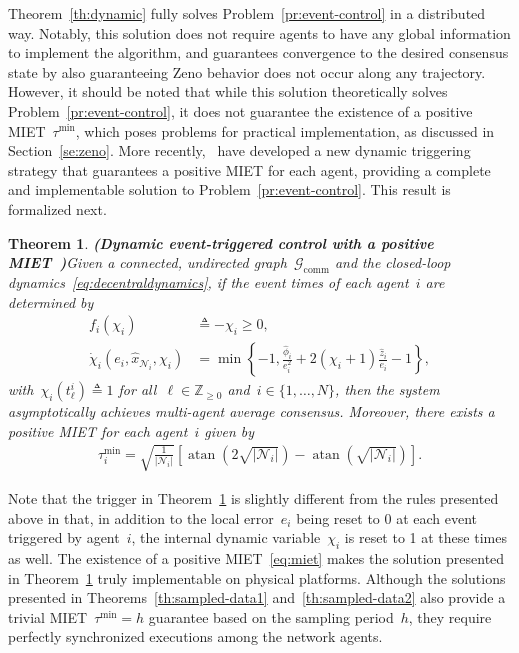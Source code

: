 \documentclass{autart}
\newtheorem{theorem}{Theorem}[section]
\newcommand{\integernonnegative}{\mathbb{Z}_{\ge 0}}
\newcommand{\GG}{{\mathcal{G}}}
\newcommand{\NN}{{\mathcal{N}}}
\newcommand{\until}[1]{\{1,\dots, #1\}}
\newcommand{\commgraph}{\GG_\text{comm}}
\renewcommand{\hat}{\widehat}
\newcommand{\longthmtitle}[1]{\mbox{}\textup{\textbf{(#1)}}}
\newcommand{\changes}[1]{{\color{blue} #1}}
\renewcommand{\changes}[1]{#1}
\begin{document}
Theorem~\ref{th:dynamic} fully solves Problem~\ref{pr:event-control}
in a distributed way. Notably, this solution does not require agents
to have any global information to implement the algorithm, and
guarantees convergence to the desired consensus state by also
guaranteeing Zeno behavior does not occur along any
trajectory. \changes{However, it should be noted that while this
  solution theoretically solves Problem~\ref{pr:event-control}, it
  does not guarantee the existence of a positive
  MIET~$\tau^\text{min}$, which poses problems for practical
  implementation, as discussed in Section~\ref{se:zeno}. More
  recently,~\cite{JB-CN:19-acc} have developed a new dynamic
  triggering strategy that guarantees a positive MIET for each agent,
  providing a complete and implementable solution to
  Problem~\ref{pr:event-control}. This result is formalized next.

  \begin{theorem}\longthmtitle{Dynamic event-triggered control with a
      positive MIET~\citep{JB-CN:19-acc}}\label{th:dynamic2}
    Given a connected, undirected graph~$\commgraph$ and the
    closed-loop dynamics~\eqref{eq:decentraldynamics}, if the event
    times of each agent~$i$ are determined by
    \begin{align}
      f_i(\chi_i) &\triangleq -\chi_i \geq 0, \\
      \dot{\chi}_i(e_i,\hat{x}_{\NN_i},\chi_i) &=
      \min \left\lbrace -1, \frac{\hat{\phi}_i}{e_i^2} + 2(\chi_i + 1) \frac{\hat{z}_i}{e_i} -1 \right\rbrace,
    \end{align}
    with~$\chi_i(t_\ell^i) \triangleq 1$ for all~$\ell \in
    \integernonnegative$ and~$i \in \until{N}$, then the system
    asymptotically achieves multi-agent average consensus.  Moreover,
    there exists a positive MIET for each agent~$i$ given by
    \begin{align}\label{eq:miet}
      \tau_i^\text{min} = \sqrt{\frac{1}{|\NN_i|}} \left[
        \operatorname{atan}(2 \sqrt{|\NN_i|}) -
        \operatorname{atan}(\sqrt{|\NN_i|}) \right].
    \end{align}
  \end{theorem}
}

\changes{Note that the trigger in Theorem~\ref{th:dynamic2} is
  slightly different from the rules presented above in that, in
  addition to the local error~$e_i$ being reset to $0$ at each event
  triggered by agent~$i$, the internal dynamic variable~$\chi_i$ is
  reset to 1 at these times as well. The existence of a positive
  MIET~\eqref{eq:miet} makes the solution presented in
  Theorem~\ref{th:dynamic2} truly implementable on physical platforms.
  Although the solutions presented in Theorems~\ref{th:sampled-data1}
  and~\ref{th:sampled-data2} also provide a trivial
  MIET~$\tau^\text{min} = h$ guarantee based on the sampling
  period~$h$, they require perfectly synchronized executions among the
  network agents. }
\end{document}
